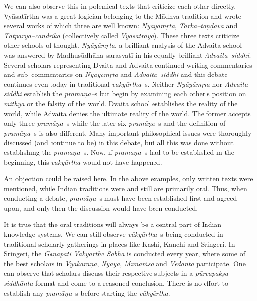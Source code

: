 We can also observe this in polemical texts that criticize each other directly. Vyāsatīrtha was a great logician belonging to the Mādhva tradition and wrote several works of which three are well known: \textit{Nyāyāmṛta}, \textit{Tarka–tāṇḍava} and \textit{Tātparya–candrikā} (collectively called \textit{Vyāsatraya}). These three texts criticize other schools of thought. \textit{Nyāyāmṛta}, a brilliant analysis of the Advaita school was answered by Madhusūdhāna–sarasvatī in his equally brilliant \textit{Advaita–siddhi}. Several scholars representing Dvaita and Advaita continued writing commentaries and sub–commentaries on \textit{Nyāyāmṛta} and \textit{Advaita–siddhi} and this debate continues even today in traditional \textit{vakyārtha}–s. Neither \textit{Nyāyāmṛta} nor \textit{Advaita–siddhi} establish the \textit{pramāṇa–}s but begin by examining each other’s position on \textit{mithyā} or the falsity of the world. Dvaita school establishes the reality of the world, while Advaita denies the ultimate reality of the world. The former accepts only three \textit{pramāṇa–}s while the later six \textit{pramāṇa–}s and the definition of \textit{pramāṇa–}s is also different. Many important philosophical issues were thoroughly discussed (and continue to be) in this debate, but all this was done without establishing the \textit{pramāṇa–}s. Now, if \textit{pramāṇa–}s had to be established in the beginning, this \textit{vakyārtha} would not have happened.

An objection could be raised here. In the above examples, only written texts were mentioned, while Indian traditions were and still are primarily oral. Thus, when conducting a debate, \textit{pramāṇa–}s must have been established first and agreed upon, and only then the discussion would have been conducted.

It is true that the oral traditions will always be a central part of Indian knowledge systems. We can still observe \textit{vākyārtha}–s being conducted in traditional scholarly gatherings in places like Kashi, Kanchi and Sringeri. In Sringeri, the \textit{Gaṇapati Vakyārtha Sabhā} is conducted every year, where some of the best scholars in \textit{Vyākaraṇa}, \textit{Nyāya}, \textit{Mīmāṁsā} and \textit{Vedānta} participate. One can observe that scholars discuss their respective subjects in a \textit{pūrvapakṣa–siddhānta} format and come to a reasoned conclusion. There is no effort to establish any \textit{pramāṇa}–s before starting the \textit{vākyārtha}.

